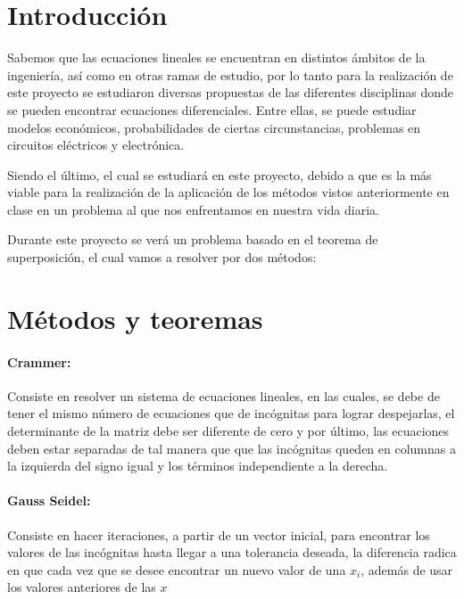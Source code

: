 \documentclass[12pt]{article}
\begin{document}
\maketitle



\section{Introducción}
Sabemos que las ecuaciones lineales se encuentran en distintos ámbitos de la ingeniería, así como en otras ramas de estudio, por lo tanto para la realización de este proyecto se estudiaron diversas propuestas de las diferentes disciplinas donde se pueden encontrar ecuaciones diferenciales. Entre ellas, se puede estudiar modelos económicos, probabilidades de ciertas circunstancias, problemas en circuitos eléctricos y electrónica.

Siendo el último, el cual se estudiará en este proyecto, debido a que es la más viable para la realización de la aplicación de los métodos vistos anteriormente en clase en un problema al que nos enfrentamos en nuestra vida diaria.

Durante este proyecto se verá un problema basado en el teorema de superposición, el cual vamos a resolver por dos métodos: 

\section{Métodos y teoremas}
\paragraph{Crammer:} 

Consiste en resolver un sistema de ecuaciones lineales, en las cuales, se debe de tener el mismo número de ecuaciones que de incógnitas para lograr despejarlas, el determinante de la matriz debe ser diferente de cero y por último, las ecuaciones deben estar separadas de tal manera que que las incógnitas queden en columnas a la izquierda del signo igual y los términos independiente a la derecha. 

\paragraph{Gauss Seidel:} 
Consiste en hacer iteraciones, a partir de un vector inicial, para encontrar los valores de las incógnitas hasta llegar a una tolerancia deseada, la diferencia radica en que cada vez que se desee encontrar un nuevo valor de una $x_i$, además de usar los valores anteriores de las $x$
\end{document}
